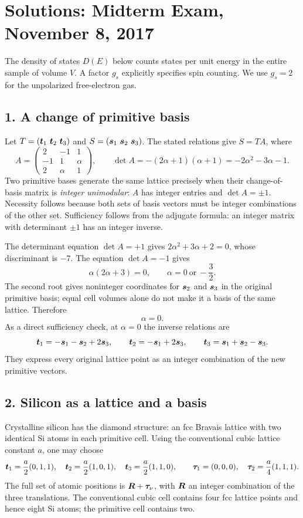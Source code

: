 \chapter{Solutions: Midterm Exam, November 8, 2017}
\label{s:physics-2017-11-midterm}
The density of states $D(E)$ below counts states per unit energy in the entire sample of volume $V$. A factor $g_s$ explicitly specifies spin counting. We use $g_s=2$ for the unpolarized free-electron gas.

\section*{1. A change of primitive basis}
Let $T=(\boldsymbol{t}_1\ \boldsymbol{t}_2\ \boldsymbol{t}_3)$ and $S=(\boldsymbol{s}_1\ \boldsymbol{s}_2\ \boldsymbol{s}_3)$. The stated relations give $S=TA$, where
\[
A=\begin{pmatrix}2&-1&1\\-1&1&\alpha\\2&\alpha&1\end{pmatrix},
\qquad
\det A=-(2\alpha+1)(\alpha+1)=-2\alpha^2-3\alpha-1.
\]
Two primitive bases generate the same lattice precisely when their change-of-basis matrix is \emph{integer unimodular}: $A$ has integer entries and $\det A=\pm1$. Necessity follows because both sets of basis vectors must be integer combinations of the other set. Sufficiency follows from the adjugate formula: an integer matrix with determinant $\pm1$ has an integer inverse.

The determinant equation $\det A=+1$ gives $2\alpha^2+3\alpha+2=0$, whose discriminant is $-7$. The equation $\det A=-1$ gives
\[
\alpha(2\alpha+3)=0,
\qquad \alpha=0\ \text{or}\ -\frac32.
\]
The second root gives noninteger coordinates for $\boldsymbol{s}_2$ and $\boldsymbol{s}_3$ in the original primitive basis; equal cell volumes alone do not make it a basis of the same lattice. Therefore
\[
\boxed{\alpha=0}.
\]
As a direct sufficiency check, at $\alpha=0$ the inverse relations are
\[
\boldsymbol{t}_1=-\boldsymbol{s}_1-\boldsymbol{s}_2+2\boldsymbol{s}_3,\qquad
\boldsymbol{t}_2=-\boldsymbol{s}_1+2\boldsymbol{s}_3,\qquad
\boldsymbol{t}_3=\boldsymbol{s}_1+\boldsymbol{s}_2-\boldsymbol{s}_3.
\]
They express every original lattice point as an integer combination of the new primitive vectors.

\section*{2. Silicon as a lattice and a basis}
Crystalline silicon has the diamond structure: an fcc Bravais lattice with two identical Si atoms in each primitive cell. Using the conventional cubic lattice constant $a$, one may choose
\[
\boldsymbol{t}_1=\frac a2(0,1,1),\quad
\boldsymbol{t}_2=\frac a2(1,0,1),\quad
\boldsymbol{t}_3=\frac a2(1,1,0),
\qquad
\boldsymbol{\tau}_1=(0,0,0),\quad
\boldsymbol{\tau}_2=\frac a4(1,1,1).
\]
The full set of atomic positions is $\boldsymbol{R}+\boldsymbol{\tau}_\nu$, with $\boldsymbol{R}$ an integer combination of the three translations. The conventional cubic cell contains four fcc lattice points and hence eight Si atoms; the primitive cell contains two.

